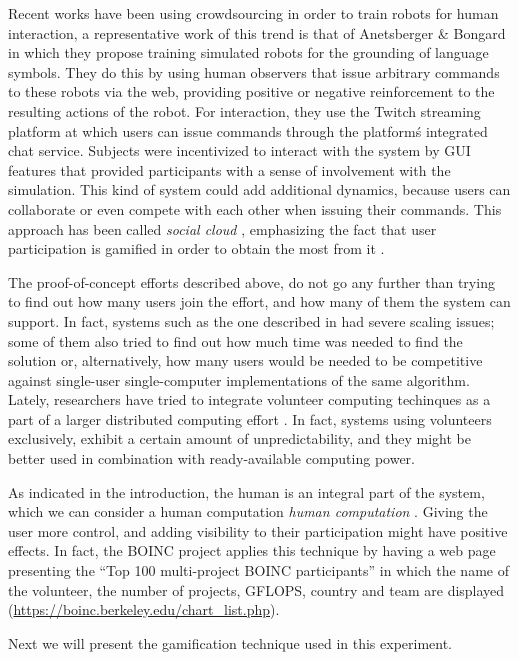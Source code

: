 \documentclass{llncs}
\begin{document}
Recent works have been using crowdsourcing in order to train robots
for human interaction, a representative work of this trend is that of
Anetsberger \& Bongard \cite{anetsbergerrobots} in which they propose
training simulated robots for the grounding of language symbols. They do this by using human observers that issue arbitrary commands to these robots via the web, providing positive or negative reinforcement to the resulting actions of the robot. For interaction, they use the Twitch streaming platform at which users can issue commands through the
platform\'s integrated chat service. Subjects were incentivized to
interact with the system by GUI features that provided participants
with a sense of involvement with the simulation. This kind of system
could add additional dynamics, because users can collaborate or
even compete with each other when issuing their commands. This approach has been called {\em social cloud} \cite{6404452}, emphasizing the fact that user participation is gamified in order to obtain the most from it \cite{7027564}.

The proof-of-concept efforts described above, do not go any further than trying to find out how many users join the effort, and how many of them the system can support. In fact, systems such as the one described in
\cite{gecco07:workshop:dcor} had severe scaling issues; some of them
also tried to find out how much time was needed to find the solution
or, alternatively, how many users would be needed to be competitive
against single-user single-computer implementations of the same
algorithm. Lately, researchers have tried to integrate volunteer computing techinques as a part of a larger distributed computing effort \cite{leclerc2016seamless}.  In fact, systems using volunteers exclusively, exhibit a certain amount of unpredictability, and they might be better used in combination with ready-available computing power.

As indicated in the introduction, the human is an integral part of the system, which we can consider a human computation {\em human computation} \cite{quinn2011human}. Giving the user more control, and adding visibility to their participation might have positive effects. In fact, the BOINC project applies this technique by having a web page presenting the ``Top 100 multi-project BOINC participants'' in which the name of the volunteer, the number of projects, GFLOPS, country and team are displayed
(\url{https://boinc.berkeley.edu/chart_list.php}).

Next we will present the gamification technique used in this experiment.
\end{document}
